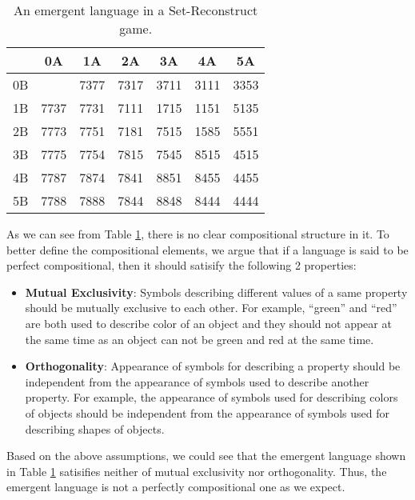 \begin{table}[!h]
    \centering
    \begin{tabular}{|c|c|c|c|c|c|c|}
        \hline
           & 0A   & 1A   & 2A   & 3A   & 4A   & 5A   \\ \hline
        0B &      & 7377 & 7317 & 3711 & 3111 & 3353 \\ \hline
        1B & 7737 & 7731 & 7111 & 1715 & 1151 & 5135 \\ \hline
        2B & 7773 & 7751 & 7181 & 7515 & 1585 & 5551 \\ \hline
        3B & 7775 & 7754 & 7815 & 7545 & 8515 & 4515 \\ \hline
        4B & 7787 & 7874 & 7841 & 8851 & 8455 & 4455 \\ \hline
        5B & 7788 & 7888 & 7844 & 8848 & 8444 & 4444 \\ \hline
        \end{tabular}
    \caption{An emergent language in a Set-Reconstruct game.}
    \label{tab4.2:emregent_language_generation}
\end{table}

As we can see from Table \ref{tab4.2:emregent_language_generation}, there is no clear compositional structure in it. To better define the compositional elements, we argue that if a language is said to be perfect compositional, then it should satisify the following 2 properties:

\begin{itemize}
    \item \textbf{Mutual Exclusivity}: Symbols describing different values of a same property should be mutually exclusive to each other. For example, ``green'' and ``red'' are both used to describe color of an object and they should not appear at the same time as an object can not be green and red at the same time.
    \item \textbf{Orthogonality}: Appearance of symbols for describing a property should be independent from the appearance of symbols used to describe another property. For example, the appearance of symbols used for describing colors of objects should be independent from the appearance of symbols used for describing shapes of objects.
\end{itemize}

Based on the above assumptions, we could see that the emergent language shown in Table \ref{tab4.2:emregent_language_generation} satisifies neither of mutual exclusivity nor orthogonality. Thus, the emergent language is not a perfectly compositional one as we expect.

